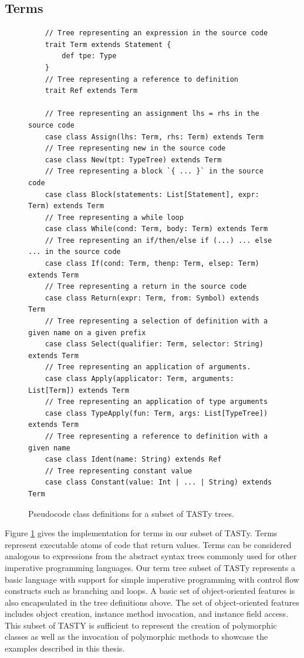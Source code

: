 \subsection{Terms}
\label{section:tasty:terms}

\begin{figure}[!htb]
	\begin{verbatim}
	// Tree representing an expression in the source code
	trait Term extends Statement {
		def tpe: Type
	}
	// Tree representing a reference to definition      
	trait Ref extends Term             
	
	// Tree representing an assignment lhs = rhs in the source code
	case class Assign(lhs: Term, rhs: Term) extends Term
	// Tree representing new in the source code
	case class New(tpt: TypeTree) extends Term
	// Tree representing a block `{ ... }` in the source code
	case class Block(statements: List[Statement], expr: Term) extends Term
	// Tree representing a while loop
	case class While(cond: Term, body: Term) extends Term
	// Tree representing an if/then/else if (...) ... else ... in the source code
	case class If(cond: Term, thenp: Term, elsep: Term) extends Term
	// Tree representing a return in the source code
	case class Return(expr: Term, from: Symbol) extends Term
	// Tree representing a selection of definition with a given name on a given prefix
	case class Select(qualifier: Term, selector: String) extends Term 
	// Tree representing an application of arguments.
	case class Apply(applicator: Term, arguments: List[Term]) extends Term
	// Tree representing an application of type arguments
	case class TypeApply(fun: Term, args: List[TypeTree]) extends Term
	// Tree representing a reference to definition with a given name
	case class Ident(name: String) extends Ref 
	// Tree representing constant value
	case class Constant(value: Int | ... | String) extends Term 
	\end{verbatim} 
	\caption{Pseudocode class definitions for a subset of TASTy trees.}
	\label{tasty:terms}
\end{figure}

Figure \ref{tasty:terms} gives the implementation for terms in our subset of TASTy.
Terms represent executable atoms of code that return values.
Terms can be considered analogous to expressions from the abstract syntax trees commonly used for other imperative programming languages.
Our term tree subset of TASTy represents a basic language with support for simple imperative programming with control flow constructs such as branching and loops.
A basic set of object-oriented features is also encapsulated in the tree definitions above.
The set of object-oriented features includes object creation, instance method invocation, and instance field access.
This subset of TASTY is sufficient to represent the creation of polymorphic classes as well as the invocation of polymorphic methods to showcase the examples described in this thesis.

